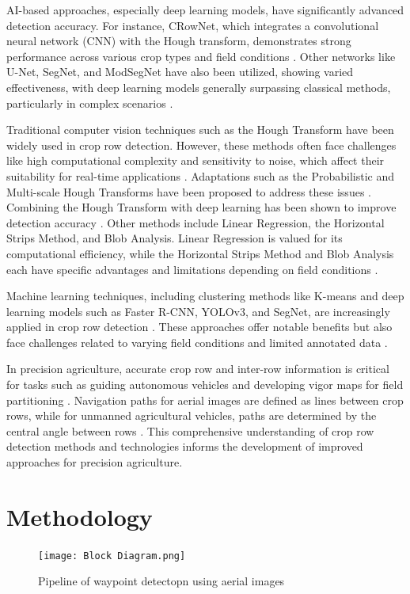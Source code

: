 \documentclass[conference]{IEEEtran}
\begin{document}
AI-based approaches, especially deep learning models, have significantly advanced detection accuracy. For instance, CRowNet, which integrates a convolutional neural network (CNN) with the Hough transform, demonstrates strong performance across various crop types and field conditions \cite{b8,b14}. Other networks like U-Net, SegNet, and ModSegNet have also been utilized, showing varied effectiveness, with deep learning models generally surpassing classical methods, particularly in complex scenarios \cite{b5,b13}.

Traditional computer vision techniques such as the Hough Transform have been widely used in crop row detection. However, these methods often face challenges like high computational complexity and sensitivity to noise, which affect their suitability for real-time applications \cite{b2,b15}. Adaptations such as the Probabilistic and Multi-scale Hough Transforms have been proposed to address these issues \cite{b2}. Combining the Hough Transform with deep learning has been shown to improve detection accuracy \cite{b8}. Other methods include Linear Regression, the Horizontal Strips Method, and Blob Analysis. Linear Regression is valued for its computational efficiency, while the Horizontal Strips Method and Blob Analysis each have specific advantages and limitations depending on field conditions \cite{b2}.

Machine learning techniques, including clustering methods like K-means and deep learning models such as Faster R-CNN, YOLOv3, and SegNet, are increasingly applied in crop row detection \cite{b2,b5}. These approaches offer notable benefits but also face challenges related to varying field conditions and limited annotated data \cite{b2,b5}.

In precision agriculture, accurate crop row and inter-row information is critical for tasks such as guiding autonomous vehicles and developing vigor maps for field partitioning \cite{b11}. Navigation paths for aerial images are defined as lines between crop rows, while for unmanned agricultural vehicles, paths are determined by the central angle between rows \cite{b1}. This comprehensive understanding of crop row detection methods and technologies informs the development of improved approaches for precision agriculture.

\section{Methodology}
\begin{figure}[htbp]
\texttt{[image: Block Diagram.png]}
\caption{Pipeline of waypoint detectopn using aerial images}
\label{fig1}
\end{figure}
\end{document}
